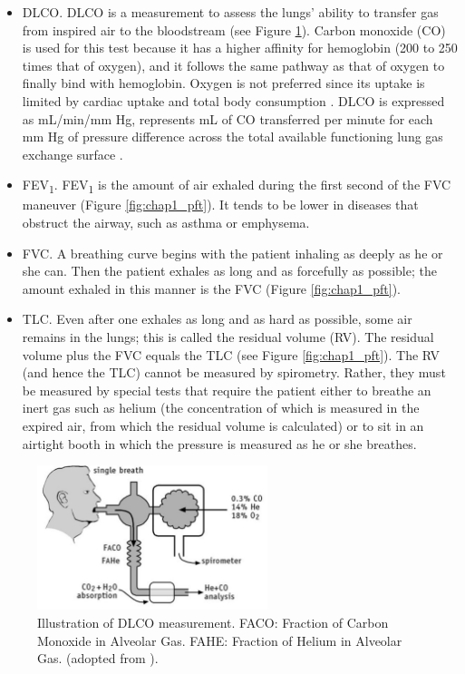 \begin{itemize} 
\item DLCO. DLCO is a measurement to assess the lungs' ability to transfer gas from inspired air to the bloodstream \cite{Graham2017} (see Figure \ref{fig:chap1_dlco}). Carbon monoxide (CO) is used for this test because it has a higher affinity for hemoglobin (200 to 250 times that of oxygen), and it follows the same pathway as that of oxygen to finally bind with hemoglobin. Oxygen is not preferred since its uptake is limited by cardiac uptake and total body consumption \cite{mehra2017evaluation}. DLCO is expressed as mL/min/mm Hg, represents mL of CO transferred per minute for each mm Hg of pressure difference across the total available functioning lung gas exchange surface \cite{macintyre2005standardisation}. 

\item FEV\textsubscript{1}. FEV\textsubscript{1} is the amount of air exhaled during the first second of the FVC maneuver (Figure \ref{fig:chap1_pft}). It tends to be lower in diseases that obstruct the airway, such as asthma or emphysema.

\item FVC. A breathing curve begins with the patient inhaling as deeply as he or she can. Then the patient exhales as long and as forcefully as possible; the amount exhaled in this manner is the FVC (Figure \ref{fig:chap1_pft}).

\item TLC. Even after one exhales as long and as hard as possible, some air remains in the lungs; this is called the residual volume (RV). The residual volume plus the FVC equals the TLC (see Figure \ref{fig:chap1_pft}). The RV (and hence the TLC) cannot be measured by spirometry. Rather, they must be measured by special tests that require the patient either to breathe an inert gas such as helium (the concentration of which is measured in the expired air, from which the residual volume is calculated) or to sit in an airtight booth in which the pressure is measured as he or she breathes. 

\end{itemize}



\begin{figure}[tb]
    \centering
    \includegraphics[width=0.6\textwidth]{Introduction/figures/dlco.jpg}
    \caption{Illustration of DLCO measurement. FACO: Fraction of Carbon Monoxide in Alveolar Gas. FAHE: Fraction of Helium in Alveolar Gas. (adopted from \cite{Sylvester2020}).}
    \label{fig:chap1_dlco}
\end{figure}




